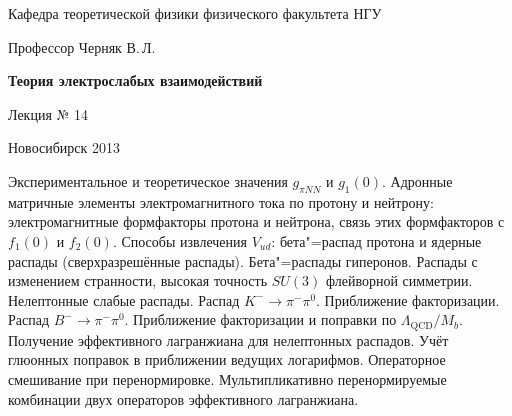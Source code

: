 \documentclass[12pt,pagesize,paper=landscape,paper=192mm:108mm]{scrbook}
\begin{document}
\begin{titlepage}
\begin{center}
    Кафедра теоретической физики физического факультета НГУ
    \medskip

    \Large
    Профессор Черняк В.\,Л.
    \bigskip

    \huge
    \textbf{Теория электрослабых взаимодействий}
    \bigskip

    \Large
    Лекция № 14
    \vfill

    \vfill

\normalsize    Новосибирск 2013
  \smallskip

  \ccbysa
  \end{center}
\end{titlepage}
\newpage

\vspace*{-1em}
\begin{center}
 \vfill
  \begin{minipage}{0.66\linewidth}
    Экспериментальное и теоретическое значения $g_{\pi NN}$ и
    $g_1(0)$.  Адронные матричные элементы электромагнитного тока по
    протону и нейтрону: электромагнитные формфакторы протона и
    нейтрона, связь этих формфакторов с $f_1(0)$ и $f_2(0)$.  Способы
    извлечения $V_{ud}$: бета"=распад протона и ядерные распады
    (сверхразрешённые распады). Бета"=распады гиперонов.  Распады с
    изменением странности, высокая точность $SU(3)$ флейворной
    симметрии. Нелептонные слабые распады.  Распад
    $K^-\to\pi^-\pi^0$. Приближение факторизации.  Распад
    $B^-\to\pi^-\pi^0$. Приближение факторизации и поправки по
    $\Lambda_{\text{QCD}}/M_b$.  Получение эффективного лагранжиана
    для нелептонных распадов. Учёт глюонных поправок в приближении
    ведущих логарифмов.  Операторное смешивание при
    перенормировке. Мультипликативно перенормируемые комбинации двух
    операторов эффективного лагранжиана.
  \end{minipage}
  \vfill

\end{center}
\end{document}

